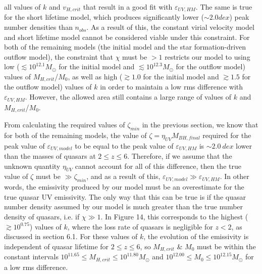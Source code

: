 \documentclass[12pt, twocolumn]{article}%
\begin{document}
\twocolumngrid


\noindent all values of $k$ and $v_{H,crit}$ that result in a good fit with $\varepsilon_{UV,HM}$. The same is true for the short lifetime model, which produces significantly lower ($\sim2.0dex$) peak number densities than $n_{obs}$. As a result of this, the constant virial velocity model and short lifetime model cannot be considered viable under this constraint. For both of the remaining models (the initial model and the star formation-driven outflow model), the constraint that $\chi$ must be $>1$ restricts our model to using low ($\lesssim10^{12.1}M_\odot$ for the initial model and $\lesssim10^{12.3}M_\odot$ for the outflow model) values of $M_{H,crit}$/$M_0$, as well as high ($\gtrsim1.0$ for the initial model and $\gtrsim1.5$ for the outflow model) values of $k$ in order to maintain a low rms difference with $\varepsilon_{UV,HM}$. However, the allowed area still contains a large range of values of $k$ and $M_{H,crit}$/$M_0$.\par

From calculating the required values of $\zeta_{min}$ in the previous section, we know that for both of the remaining models, the value of $\zeta=\eta_{UV}M_{BH,final}$ required for the peak value of $\varepsilon_{UV,model}$ to be equal to the peak value of $\varepsilon_{UV,HM}$ is $\sim2.0\:dex$ lower than the masses of quasars at $2\leq z\leq6$. Therefore, if we assume that the unknown quantity $\eta_{UV}$ cannot account for all of this difference, then the true value of $\zeta$ must be $\gg\zeta_{min}$, and as a result of this, $\varepsilon_{UV,model}\gg\varepsilon_{UV,HM}$. In other words, the emissivity produced by our model must be an overestimate for the true quasar UV emissivity. The only way that this can be true is if the quasar number density assumed by our model is much greater than the true number density of quasars, i.e. if $\chi\gg1$. In Figure 14, this corresponds to the highest ($\gtrsim10^{0.75}$) values of $k$, where the loss rate of quasars is negligible for $z<2$, as discussed in section 6.1. For these values of $k$, the evolution of the emissivity is independent of quasar lifetime for $2\leq z\leq6$, so $M_{H,crit}$ \& $M_0$ must be within the constant intervals $10^{11.65}\leq M_{H,crit}\leq10^{11.80}M_\odot$ and $10^{12.00}\leq M_0\leq10^{12.15}M_\odot$ for a low rms difference.

\onecolumngrid
\end{document}
